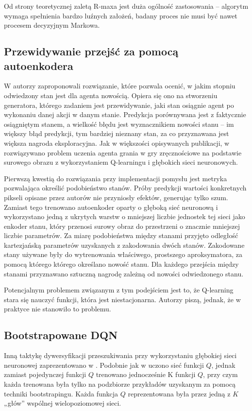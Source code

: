 Od strony teoretycznej zaletą R-maxa jest duża ogólność zastosowania – algorytm wymaga spełnienia bardzo luźnych założeń, badany proces nie musi być nawet procesem decyzyjnym Markowa.

\subsection{Przewidywanie przejść za pomocą autoenkodera}
W \cite{DBLP:journals/corr/StadieLA15} autorzy zaproponowali rozwiązanie, które pozwala ocenić, w jakim stopniu odwiedzony stan jest dla agenta nowością. Opiera się ono na stworzeniu generatora, którego zadaniem jest przewidywanie, jaki stan osiągnie agent po wykonaniu danej akcji w danym stanie. Predykcja porównywana jest z faktycznie osiągniętym stanem, a wielkość błędu jest wyznacznikiem nowości stanu – im większy błąd predykcji, tym bardziej nieznany stan, za co przyznawana jest większa nagroda eksploracyjna. Jak w większości opisywanych publikacji, w \cite{DBLP:journals/corr/StadieLA15} rozwiązywano problem uczenia agenta grania w gry zręcznościowe na podstawie surowego obrazu z wykorzystaniem Q-learningu i głębokich sieci neuronowych.

Pierwszą kwestią do rozwiązania przy implementacji pomysłu jest metryka pozwalająca określić podobieństwo stanów. Próby predykcji wartości konkretnych pikseli opisane przez autorów nie przyniosły efektów, generując tylko szum. Zamiast tego trenowano autoenkoder oparty o głęboką sieć neuronową i wykorzystano jedną z ukrytych warstw o mniejszej liczbie jednostek tej sieci jako enkoder stanu, który przenosi surowy obraz do przestrzeni o znacznie mniejszej liczbie parametrów. Za miarę podobieństwa między stanami przyjęto odległość kartezjańską parametrów uzyskanych z zakodowania dwóch stanów. Zakodowane stany używane były do wytrenowania właściwego, prostszego aproksymatora, za pomocą którego którego określano nowość stanu. Dla każdego przejścia między stanami przyznawano sztuczną nagrodę zależną od nowości odwiedzonego stanu.

Potencjalnym problemem związanym z tym podejściem jest to, że Q-learning stara się nauczyć funkcji, która jest niestacjonarna. Autorzy piszą, jednak, że w praktyce nie stanowiło to problemu.

\subsection{Bootstrapowane DQN}
Inną taktykę dywersyfikacji przeszukiwania przy wykorzystaniu głębokiej sieci neuronowej zaprezentowano w \cite{DBLP:journals/corr/OsbandBPR16}. Podobnie jak w \cite{DBLP:journals/corr/StadieLA15} uczono sieć funkcji $Q$, jednak zamiast pojedynczej funkcji $Q$ trenowano jednocześnie K funkcji $Q$, przy czym każda trenowana była tylko na podzbiorze przykładów uzyskanym za pomocą techniki bootstrapingu. Każda funkcja $Q$ reprezentowana była przez jedną z $K$ „głów” wspólnej wielopoziomowej sieci.


